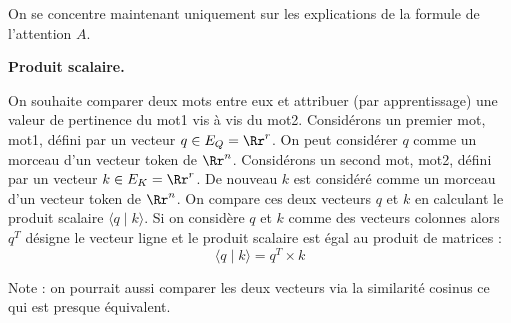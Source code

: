 \documentclass[11pt,class=report,crop=false]{standalone}
\begin{document}
On se concentre maintenant uniquement sur les explications de la formule de l'attention $A$.


\textbf{Produit scalaire.}

On souhaite comparer deux mots entre eux et attribuer (par apprentissage) une valeur de pertinence du mot1 vis à vis du mot2. Considérons un premier mot, mot1, défini par un vecteur $q \in E_Q = \Rr^r$. On peut considérer $q$ comme un morceau d'un vecteur token de $\Rr^n$.
Considérons un second mot, mot2, défini par un vecteur $k \in E_K = \Rr^r$.
De nouveau $k$ est considéré comme un morceau d'un vecteur token de $\Rr^n$.
On compare ces deux vecteurs $q$ et $k$ en calculant le produit scalaire $\langle q \mid k \rangle$.
Si on considère $q$ et $k$ comme des vecteurs colonnes alors $q^T$ désigne le vecteur ligne et le produit scalaire est égal au produit de matrices :
$$\langle q \mid k \rangle = q^T \times k$$

Note : on pourrait aussi comparer les deux vecteurs via la similarité cosinus ce qui est presque équivalent.
\end{document}

